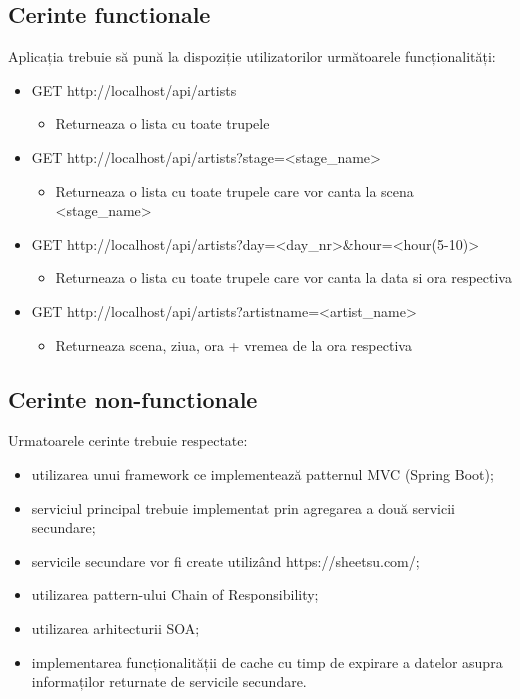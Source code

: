 \documentclass[11pt,a4paper,twoside,notitlepage]{article}
\begin{document}
\subsection{Cerinte functionale}
Aplicația trebuie să pună la dispoziție utilizatorilor următoarele funcționalități:
\begin{itemize}
	\item GET http://localhost/api/artists
		\begin{itemize}
			\item Returneaza o lista cu toate trupele
		\end{itemize}
	\item GET http://localhost/api/artists?stage=\textless stage\_name\textgreater
		\begin{itemize}
			\item Returneaza o lista cu toate trupele care vor canta la scena \textless stage\_name\textgreater
		\end{itemize}
	\item GET http://localhost/api/artists?day=\textless day\_nr\textgreater\&hour=\textless hour(5-10)\textgreater
		\begin{itemize}
			\item Returneaza o lista cu toate trupele care vor canta la data si ora respectiva
		\end{itemize}
	\item GET http://localhost/api/artists?artistname=\textless artist\_name\textgreater
		\begin{itemize}
			\item Returneaza scena, ziua, ora + vremea de la ora respectiva

		\end{itemize}
\end{itemize}

\subsection{Cerinte non-functionale}
Urmatoarele cerinte trebuie respectate:
\begin{itemize}
	\item 	utilizarea unui framework ce implementează patternul MVC (Spring Boot);
	\item	serviciul principal trebuie implementat prin agregarea a două servicii secundare;
	\item 	servicile secundare vor fi create utiliz\^{a}nd https://sheetsu.com/;
	\item 	utilizarea pattern-ului Chain of Responsibility;
	\item	utilizarea arhitecturii SOA;
	\item 	implementarea funcționalității de cache cu timp de expirare a datelor asupra informaților returnate de servicile secundare.
\end{itemize}
\end{document}
